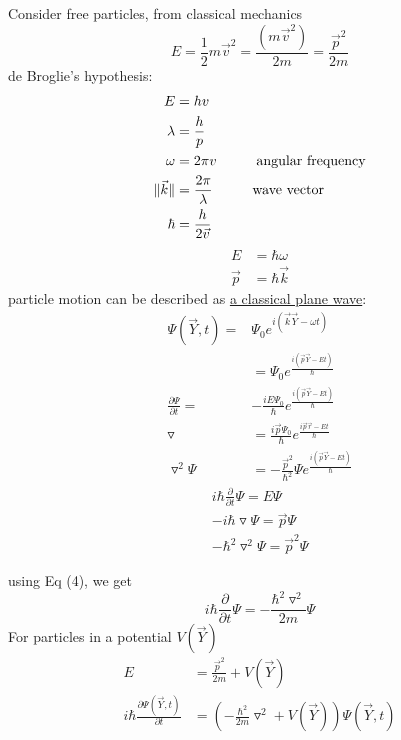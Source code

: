 \documentclass[12pt, a4paper]{article}
\newcommand{\tab}[1][1cm]{\hspace*{#1}}
\begin{document}
Consider free particles, from classical mechanics
\begin{equation}
E=\frac{1}{2}m\vec{v}^2=\frac{(m\vec{v}^2)}{2m}=\frac{\vec{p}^2}{2m}
\end{equation}
de Broglie's hypothesis:
\begin{align*}
E&=hv\\
\lambda&=\frac{h}{p}\\
\omega&=2\pi v\tab \text{angular frequency}\\
\| \vec{k}\|&=\frac{2\pi}{\lambda} \tab \text{wave vector}\\
\hbar&=\frac{h}{2\vec{v}}
\end{align*}
\begin{align}
E&=\hbar \omega\\
\vec{p}&=\hbar \vec{k}
\end{align}
particle motion can be described as \underline{a classical plane wave}:
\begin{align*}
\Psi(\vec{Y},t)=&\Psi_0e^{i(\vec{k}\vec{Y}-\omega t)}\\
&=\Psi_0e^{\frac{i(\vec{p}\vec{Y}-Et)}{\hbar}}\\
\frac{\partial \Psi}{\partial t}=&-\frac{iE\Psi_0}{\hbar}e^{\frac{i(\vec{p}\vec{Y}-Et)}{\hbar}}\\
\triangledown &= \frac{i\vec{p}\Psi_0}{\hbar}e^{\frac{i\vec{p}\vec{r}-Et}{\hbar}}\\
\triangledown^2 \Psi&=-\frac{\vec{p}^2}{\hbar^2}\Psi e^{\frac{i(\vec{p}\vec{Y}-Et)}{\hbar}}
\end{align*}
\begin{align}
i\hbar \frac{\partial}{\partial t}\Psi = E\Psi\\
-i\hbar \triangledown \Psi = \vec{p}\Psi\\
-\hbar^2 \triangledown^2 \Psi=\vec{p}^2\Psi
\end{align}

using Eq (4), we get
\begin{equation}
i\hbar \frac{\partial}{\partial t}\Psi=-\frac{\hbar^2 \triangledown^2}{2m}\Psi
\end{equation}
For particles in a potential $V(\vec{Y})$
\begin{align}
E&=\frac{\vec{p}^2}{2m}+V(\vec{Y})\\
i\hbar \frac{\partial \Psi(\vec{Y},t)}{\partial t}&=\left( -\frac{\hbar^2}{2m}\triangledown^2+V(\vec{Y}) \right)\Psi(\vec{Y},t)
\end{align}
\end{document}
